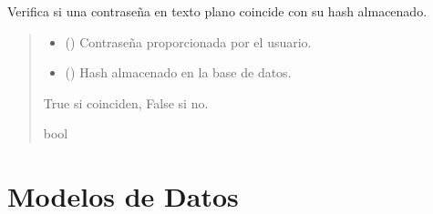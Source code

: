 \documentclass[letterpaper,10pt,spanish]{sphinxmanual}
\begin{document}

\begin{fulllineitems}
\label{\detokenize{endpoints:main.verificar_password}}
\pysigstartsignatures
\pysiglinewithargsret
{}
{\sphinxparamcomma {}}
{}
\pysigstopsignatures
\sphinxAtStartPar
Verifica si una contraseña en texto plano coincide con su hash almacenado.
\begin{quote}\begin{description}
\begin{itemize}
\item {} 
\sphinxAtStartPar
{} () \textendash{} Contraseña proporcionada por el usuario.

\item {} 
\sphinxAtStartPar
{} () \textendash{} Hash almacenado en la base de datos.

\end{itemize}

\sphinxAtStartPar
True si coinciden, False si no.

\sphinxAtStartPar
bool

\end{description}\end{quote}

\end{fulllineitems}


\sphinxstepscope


\chapter{Modelos de Datos}
\label{\detokenize{modelos:modelos-de-datos}}\label{\detokenize{modelos::doc}}
\end{document}

